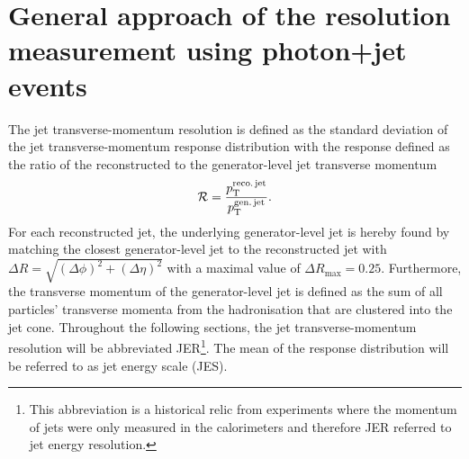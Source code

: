 \FloatBarrier
\chapter{General approach of the resolution measurement using photon+jet events}
\label{res:ch:GeneralApproach}

The jet transverse-momentum resolution is defined as the standard deviation of the jet transverse-momentum response distribution with the response defined as the ratio of the reconstructed to the generator-level jet transverse momentum 
\begin{equation}\label{res:eq:responseFormula}
\mathcal{R} =  \frac{{p}_\mathrm{T}^{\text{reco.\,jet}}}{{p}_\mathrm{T}^{\text{gen.\,jet}}}.
\end{equation}
For each reconstructed jet, the underlying generator-level jet is hereby found by matching the closest generator-level jet to the reconstructed jet with $\Delta R = \sqrt{(\Delta \phi)^2 + (\Delta \eta)^2}$ 
with a maximal value of $\Delta R_{\text{max}}=0.25$.
Furthermore, the transverse momentum of the generator-level jet is defined as the sum of all particles' transverse momenta from the hadronisation that are clustered into the jet cone.
Throughout the following sections, the jet transverse-momentum resolution will be abbreviated JER\footnote{This abbreviation is a historical relic from experiments where the momentum of jets were only measured in the calorimeters and therefore JER referred to jet energy resolution.}.
The mean of the response distribution will be referred to as jet energy scale (JES).

